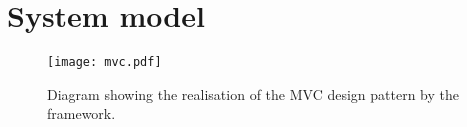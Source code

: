 \section{System model}

\begin{figure}[h]
	\centering
	\texttt{[image: mvc.pdf]}
	\caption{Diagram showing the realisation of the MVC design pattern by the framework.}
	\label{img:MVC}
\end{figure}


